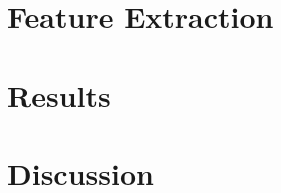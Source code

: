 \documentclass[conference]{IEEEtran}
\begin{document}
\section{Feature Extraction}
\section{Results}
\section{Discussion}




\end{document}
